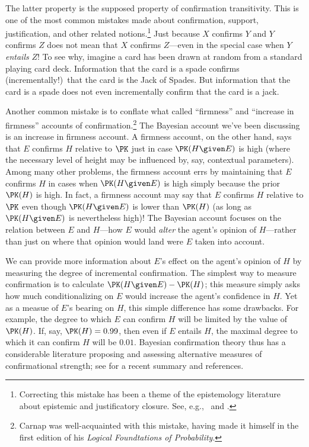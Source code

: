 The latter property is the supposed property of confirmation transitivity. This is one of the most common mistakes made about confirmation, support, justification, and other related notions.\footnote
{Correcting this mistake has been a theme of the epistemology literature about epistemic and justificatory closure. See, e.g.,\ \citet{DretskeOperators,DaviesArchitecturalism} and \citet{WrightReflections}.}
 Just because $X$ confirms $Y$ and $Y$ confirms $Z$ does not mean that $X$ confirms $Z$---even in the special case when $Y$ \emph{entails} $Z$! To see why, imagine a card has been drawn at random from a standard playing card deck. Information that the card is a spade confirms (incrementally!)\ that the card is the Jack of Spades. But information that the card is a spade does not even incrementally confirm that the card is a jack.
 
Another common mistake is to conflate what \citet{CarnapLogicalSecond} called ``firmness'' and ``increase in firmness'' accounts of confirmation.\footnote
{Carnap was well-acquainted with this mistake, having made it himself in the first \citeyear{CarnapLogical} edition of his \emph{Logical Foundtations of Probability}.}
 The Bayesian account we've been discussing is an increase in firmness account. A firmness account, on the other hand, says that $E$ confirms $H$ relative to $\PK$ just in case $\PK(H \given E)$ is high (where the necessary level of height may be influenced by, say, contextual parameters). Among many other problems, the firmness account errs by maintaining that $E$ confirms $H$ in cases when $\PK(H \given E)$ is high simply because the prior $\PK(H)$ is high. In fact, a firmness account may say that $E$ confirms $H$ relative to $\PK$ even though $\PK(H \given E)$ is lower than $\PK(H)$ (as long as $\PK(H \given E)$ is nevertheless high)! The Bayesian account focuses on the relation between $E$ and $H$---how $E$ would \emph{alter} the agent's opinion of $H$---rather than just on where that opinion would land were $E$ taken into account.
 
We can provide more information about $E$'s effect on the agent's opinion of $H$ by measuring the degree of incremental confirmation. The simplest way to measure confirmation is to calculate $\PK(H \given E)-\PK(H)$; this measure simply asks how much conditionalizing on $E$ would increase the agent's confidence in $H$. Yet as a measue of $E$'s bearing on $H$, this simple difference has some drawbacks. For example, the degree to which $E$ can confirm $H$ will be limited by the value of $\PK(H)$. If, say, $\PK(H)=0.99$, then even if $E$ entails $H$, the maximal degree to which it can confirm $H$ will be $0.01$. Bayesian confirmation theory thus has a considerable literature proposing and assessing alternative measures of confirmational strength; see \citet[Section 3.4]{CrupiSEP} for a recent summary and references.

